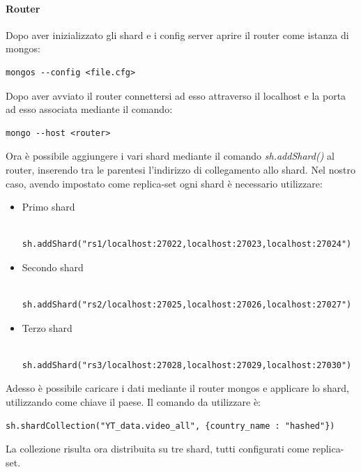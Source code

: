 \documentclass[10pt, a4paper,openany]{article}
\begin{document}
\paragraph{Router\\}
Dopo aver inizializzato gli shard e i config server aprire il router come istanza di mongos:

\begin{Verbatim}
mongos --config <file.cfg>
\end{Verbatim}

Dopo aver avviato il router connettersi ad esso attraverso il localhost e la porta ad esso associata mediante il comando:

\begin{Verbatim}
mongo --host <router>
\end{Verbatim}

Ora è possibile aggiungere i vari shard mediante il comando \textit{sh.addShard()} al router, inserendo tra le parentesi l'indirizzo di collegamento allo shard. Nel nostro caso, avendo impostato come replica-set ogni shard è necessario utilizzare:
\begin{itemize}
	\item Primo shard
	\begin{Verbatim}
	sh.addShard("rs1/localhost:27022,localhost:27023,localhost:27024")
	\end{Verbatim}
	\item Secondo shard
	\begin{Verbatim}
	sh.addShard("rs2/localhost:27025,localhost:27026,localhost:27027")
	\end{Verbatim}
	\item Terzo shard
	\begin{Verbatim}
	sh.addShard("rs3/localhost:27028,localhost:27029,localhost:27030")
	\end{Verbatim}
\end{itemize}

Adesso è possibile caricare i dati mediante il router mongos e applicare lo shard, utilizzando come chiave il paese. Il comando da utilizzare è:

\begin{Verbatim}
sh.shardCollection("YT_data.video_all", {country_name : "hashed"})
\end{Verbatim}

La collezione risulta ora distribuita su tre shard, tutti configurati come replica-set.
\end{document}
